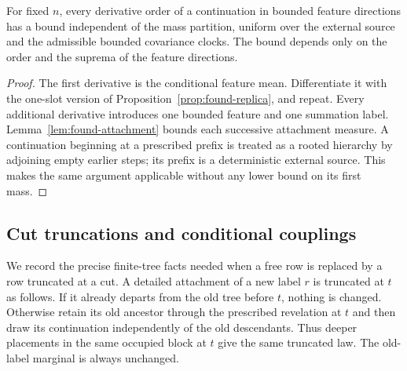 \begin{corollary}\label{cor:found-source-bounds}
For fixed $n$, every derivative order of a continuation in bounded
feature directions has a bound independent of the mass partition,
uniform over the external source and the admissible bounded covariance
clocks. The bound depends only on the order and the suprema of the
feature directions.
\end{corollary}

\begin{proof}
The first derivative is the conditional feature mean. Differentiate it
with the one-slot version of Proposition~\ref{prop:found-replica}, and
repeat. Every additional derivative introduces one bounded feature and
one summation label. Lemma~\ref{lem:found-attachment} bounds each
successive attachment measure. A continuation beginning at a prescribed
prefix is treated as a rooted hierarchy by adjoining empty earlier
steps; its prefix is a deterministic external source. This makes the
same argument applicable without any lower bound on its first mass.
\end{proof}

\subsection{Cut truncations and conditional couplings}

We record the precise finite-tree facts needed when a free row is
replaced by a row truncated at a cut. A detailed attachment of a new
label $r$ is truncated at $t$ as follows. If it already departs from the
old tree before $t$, nothing is changed. Otherwise retain its old
ancestor through the prescribed revelation at $t$ and then draw its
continuation independently of the old descendants. Thus deeper
placements in the same occupied block at $t$ give the same truncated
law. The old-label marginal is always unchanged.

